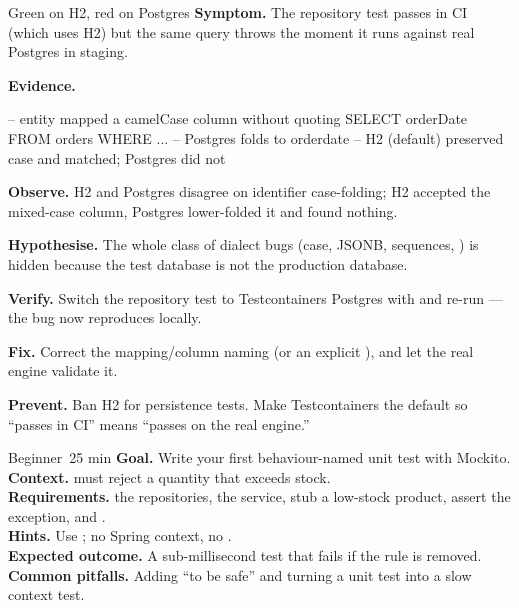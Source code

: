\begin{debuglab}{Green on H2, red on Postgres}
\textbf{Symptom.} The repository test passes in CI (which uses H2) but the same query throws  the moment it runs against real Postgres in staging.

\smallskip\textbf{Evidence.}
\begin{sqlbox}
-- entity mapped a camelCase column without quoting
SELECT orderDate FROM orders WHERE ...   -- Postgres folds to orderdate
-- H2 (default) preserved case and matched; Postgres did not
\end{sqlbox}

\begin{tickcheck}
  \item \textbf{Observe.} H2 and Postgres disagree on identifier case-folding; H2 accepted the mixed-case column, Postgres lower-folded it and found nothing.
  \item \textbf{Hypothesise.} The whole class of dialect bugs (case, JSONB, sequences, ) is hidden because the test database is not the production database.
  \item \textbf{Verify.} Switch the repository test to Testcontainers Postgres with  and re-run --- the bug now reproduces locally.
  \item \textbf{Fix.} Correct the mapping/column naming (or an explicit ), and let the real engine validate it.
  \item \textbf{Prevent.} Ban H2 for persistence tests. Make Testcontainers the default so ``passes in CI'' means ``passes on the real engine.''
\end{tickcheck}
\end{debuglab}


\begin{minilab}{Beginner}{~25 min}
\textbf{Goal.} Write your first behaviour-named unit test with Mockito.\\
\textbf{Context.}  must reject a quantity that exceeds stock.\\
\textbf{Requirements.}  the repositories,  the service, stub a low-stock product, assert the exception, and .\\
\textbf{Hints.} Use ; no Spring context, no .\\
\textbf{Expected outcome.} A sub-millisecond test that fails if the rule is removed.\\
\textbf{Common pitfalls.} Adding  ``to be safe'' and turning a unit test into a slow context test.
\end{minilab}

